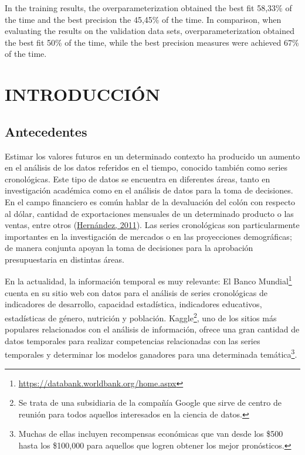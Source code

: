 \documentclass[
]{article}
\begin{document}
In the training results, the overparameterization obtained the best fit
58,33\% of the time and the best precision the 45,45\% of the time. In
comparison, when evaluating the results on the validation data sets,
overparameterization obtained the best fit 50\% of the time, while the
best precision measures were achieved 67\% of the time.

\cleardoublepage

\listoftables

\listoffigures

\cleardoublepage
{}

\newpage

\section{INTRODUCCIÓN}  


\label{chap:introduccion}
\subsection{Antecedentes}

Estimar los valores futuros en un determinado contexto ha producido un
aumento en el análisis de los datos referidos en el tiempo, conocido
también como series cronológicas. Este tipo de datos se encuentra en
diferentes áreas, tanto en investigación académica como en el análisis
de datos para la toma de decisiones. En el campo financiero es común
hablar de la devaluación del colón con respecto al dólar, cantidad de
exportaciones mensuales de un determinado producto o las ventas, entre
otros (\protect\hyperlink{ref-oscarh-1}{Hernández, 2011}). Las series
cronológicas son particularmente importantes en la investigación de
mercados o en las proyecciones demográficas; de manera conjunta apoyan
la toma de decisiones para la aprobación presupuestaria en distintas
áreas.

En la actualidad, la información temporal es muy relevante: El Banco
Mundial\footnote{\url{https://databank.worldbank.org/home.aspx}} cuenta
en su sitio web con datos para el análisis de series cronológicas de
indicadores de desarrollo, capacidad estadística, indicadores
educativos, estadísticas de género, nutrición y población.
Kaggle\footnote{Se trata de una subsidiaria de la compañía Google que
  sirve de centro de reunión para todos aquellos interesados en la
  ciencia de datos.}, uno de los sitios más populares relacionados con
el análisis de información, ofrece una gran cantidad de datos temporales
para realizar competencias relacionadas con las series temporales y
determinar los modelos ganadores para una determinada
temática\footnote{Muchas de ellas incluyen recompensas económicas que
  van desde los \$500 hasta los \$100,000 para aquellos que logren
  obtener los mejor pronósticos.}.
\end{document}
